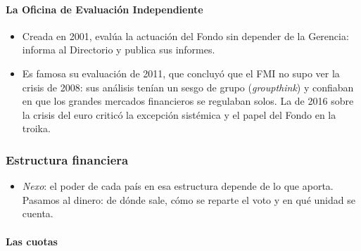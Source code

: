\documentclass[11pt]{article}
\begin{document}
\paragraph{La Oficina de Evaluación Independiente}

\begin{itemize}
\item Creada en 2001, evalúa la actuación del Fondo sin depender de la Gerencia: informa al Directorio y publica sus informes.
\item Es famosa su evaluación de 2011, que concluyó que el FMI no supo ver la crisis de 2008: sus análisis tenían un sesgo de grupo (\emph{groupthink}) y confiaban en que los grandes mercados financieros se regulaban solos\nocite{IEO2011Crisis}. La de 2016 sobre la crisis del euro criticó la excepción sistémica y el papel del Fondo en la troika\nocite{IEO2016Euro}.
\end{itemize}

\subsubsection{Estructura financiera}\label{sec:financiera}

\begin{itemize}
\item \emph{Nexo}: el poder de cada país en esa estructura depende de lo que aporta. Pasamos al dinero: de dónde sale, cómo se reparte el voto y en qué unidad se cuenta.
\end{itemize}

\paragraph{Las cuotas}
\end{document}
